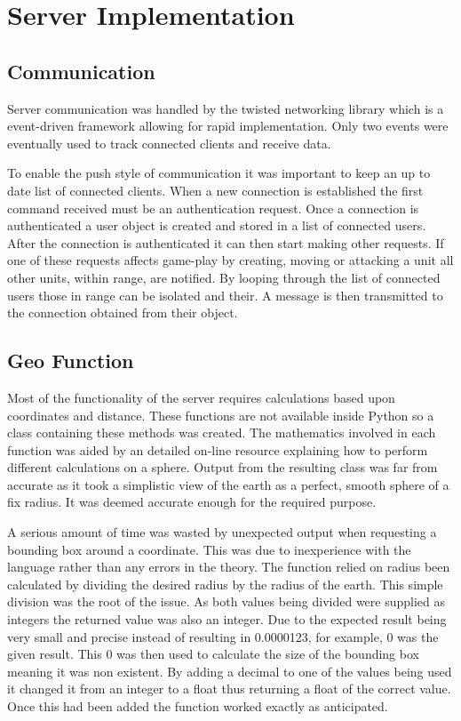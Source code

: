 \section{Server Implementation}
\subsection{Communication}
Server communication was handled by the twisted networking library which is a event-driven framework allowing for rapid implementation. Only two events were eventually used to track connected clients and receive data.

To enable the push style of communication it was important to keep an up to date list of connected clients. When a new connection is established the first command received must be an authentication request. Once a connection is authenticated a user object is created and stored in a list of connected users. After the connection is authenticated it can then start making other requests. If one of these requests affects game-play by creating, moving or attacking a unit all other units, within range, are notified. By looping through the list of connected users those in range can be isolated and their. A message is then transmitted to the connection obtained from their object.

\subsection{Geo Function}
Most of the functionality of the server requires calculations based upon coordinates and distance. These functions are not available inside Python so a class containing these methods was created. The mathematics involved in each function was aided by an detailed on-line resource\cite{geo} explaining how to perform different calculations on a sphere. Output from the resulting class was far from accurate as it took a simplistic view of the earth as a perfect, smooth sphere of a fix radius. It was deemed accurate enough for the required purpose.

A serious amount of time was wasted by unexpected output when requesting a bounding box around a coordinate. This was due to inexperience with the language rather than any errors in the theory. The function relied on radius been calculated by dividing the desired radius by the radius of the earth. This simple division was the root of the issue. As both values being divided were supplied as integers the returned value was also an integer. Due to the expected result being very small and precise instead of resulting in 0.0000123, for example, 0 was the given result. This 0 was then used to calculate the size of the bounding box meaning it was non existent. By adding a decimal to one of the values being used it changed it from an integer to a float thus returning a float of the correct value. Once this had been added the function worked exactly as anticipated.


